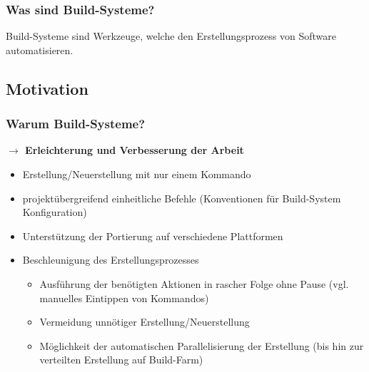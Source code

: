 \begin{frame}
	\frametitle{Was sind Build-Systeme?}
	\Large
	Build-Systeme sind Werkzeuge, welche den Erstellungsprozess von Software automatisieren.
\end{frame}

\subsection{Motivation}
\begin{frame}
	\frametitle{Warum Build-Systeme?}
	\pause
	\textbf{$\rightarrow$ Erleichterung und Verbesserung der Arbeit}
	\begin{itemize}
		\pause
		\item Erstellung/Neuerstellung mit nur einem Kommando
		\pause
		\item projektübergreifend einheitliche Befehle (Konventionen für Build-System Konfiguration)
		\pause
		\item Unterstützung der Portierung auf verschiedene Plattformen
		\pause
		\item Beschleunigung des Erstellungsprozesses
			\begin{itemize}
			\pause
			\item Ausführung der benötigten Aktionen in rascher Folge ohne Pause (vgl. manuelles Eintippen von Kommandos)
			\pause
			\item Vermeidung unnötiger Erstellung/Neuerstellung
			\pause
			\item Möglichkeit der automatischen Parallelisierung der Erstellung (bis hin zur verteilten Erstellung auf Build-Farm)
			\end{itemize}
	\end{itemize}
\end{frame}
\subsection*{}

